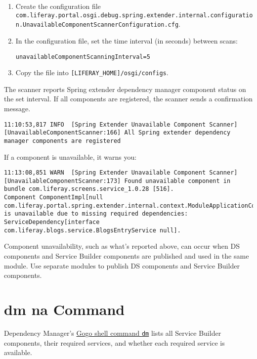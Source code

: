 \begin{enumerate}
\def\labelenumi{\arabic{enumi}.}
\item
  Create the configuration file
  \texttt{com.liferay.portal.osgi.debug.spring.extender.internal.configuration.UnavailableComponentScannerConfiguration.cfg}.
\item
  In the configuration file, set the time interval (in seconds) between
  scans:

  \texttt{unavailableComponentScanningInterval=5}
\item
  Copy the file into \texttt{{[}LIFERAY\_HOME{]}/osgi/configs}.
\end{enumerate}

The scanner reports Spring extender dependency manager component status
on the set interval. If all components are registered, the scanner sends
a confirmation message.

\begin{verbatim}
11:10:53,817 INFO  [Spring Extender Unavailable Component Scanner][UnavailableComponentScanner:166] All Spring extender dependency manager components are registered
\end{verbatim}

If a component is unavailable, it warns you:

\begin{verbatim}
11:13:08,851 WARN  [Spring Extender Unavailable Component Scanner][UnavailableComponentScanner:173] Found unavailable component in bundle com.liferay.screens.service_1.0.28 [516].
Component ComponentImpl[null com.liferay.portal.spring.extender.internal.context.ModuleApplicationContextRegistrator@1541eee] is unavailable due to missing required dependencies: ServiceDependency[interface com.liferay.blogs.service.BlogsEntryService null].
\end{verbatim}

Component unavailability, such as what's reported above, can occur when
DS components and Service Builder components are published and used in
the same module. Use separate modules to publish DS components and
Service Builder components.

\section{dm na Command}\label{dm-na-command}

Dependency Manager's
\href{http://felix.apache.org/documentation/subprojects/apache-felix-dependency-manager/tutorials/leveraging-the-shell.html}{Gogo
shell command \texttt{dm}} lists all Service Builder components, their
required services, and whether each required service is available.

